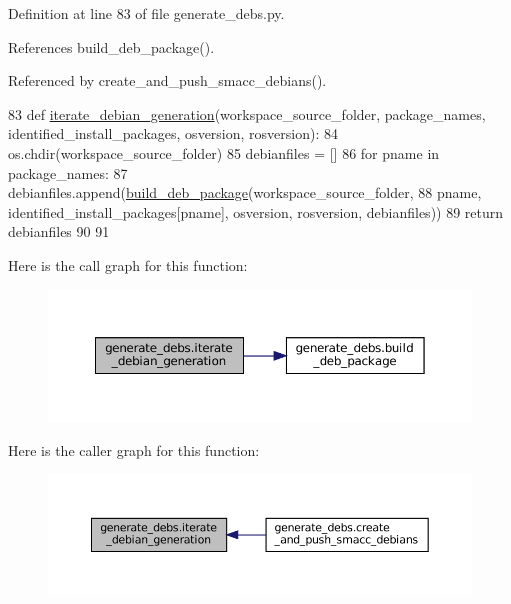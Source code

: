 Definition at line 83 of file generate\+\_\+debs.\+py.



References build\+\_\+deb\+\_\+package().



Referenced by create\+\_\+and\+\_\+push\+\_\+smacc\+\_\+debians().


\begin{DoxyCode}
83 \textcolor{keyword}{def }\hyperlink{namespacegenerate__debs_a2615a6fc7860b6aa9e920e6b4d886589}{iterate\_debian\_generation}(workspace\_source\_folder, package\_names, 
      identified\_install\_packages, osversion, rosversion):
84     os.chdir(workspace\_source\_folder)
85     debianfiles = []
86     \textcolor{keywordflow}{for} pname \textcolor{keywordflow}{in} package\_names:
87         debianfiles.append(\hyperlink{namespacegenerate__debs_aa70c3f4917ddc57b13eaed8501f571a8}{build\_deb\_package}(workspace\_source\_folder,
88                                              pname, identified\_install\_packages[pname], osversion, 
      rosversion, debianfiles))
89     \textcolor{keywordflow}{return} debianfiles
90 
91 
\end{DoxyCode}
Here is the call graph for this function\+:
\nopagebreak
\begin{figure}[H]
\begin{center}
\leavevmode
\includegraphics[width=350pt]{namespacegenerate__debs_a2615a6fc7860b6aa9e920e6b4d886589_cgraph}
\end{center}
\end{figure}
Here is the caller graph for this function\+:
\nopagebreak
\begin{figure}[H]
\begin{center}
\leavevmode
\includegraphics[width=350pt]{namespacegenerate__debs_a2615a6fc7860b6aa9e920e6b4d886589_icgraph}
\end{center}
\end{figure}
\mbox{\label{namespacegenerate__debs_a9b22f5ad65b40b7903c467eda308e575}} 
